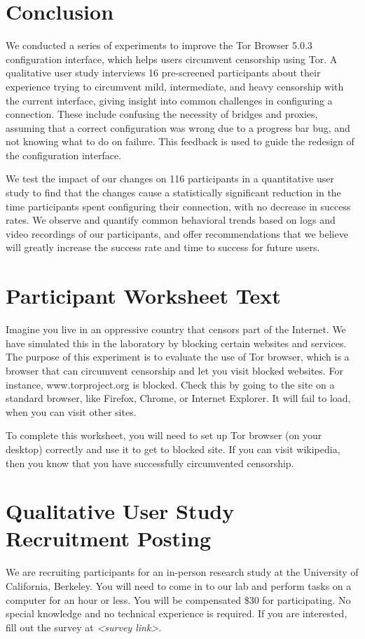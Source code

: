 \documentclass[USenglish,oneside,twocolumn]{article}
\begin{document}
\section{Conclusion} 
We conducted a series of experiments to improve the Tor Browser 5.0.3 configuration interface, which helps users circumvent censorship using Tor. A qualitative user study interviews 16 pre-screened participants about their experience trying to circumvent mild, intermediate, and heavy censorship with the current interface, giving insight into common challenges in configuring a connection. These include confusing the necessity of bridges and proxies, assuming that a correct configuration was wrong due to a progress bar bug, and not knowing what to do on failure. This feedback is used to guide the redesign of the configuration interface. 

We test the impact of our changes on 116 participants in a quantitative user study to find that the changes cause a statistically significant reduction in the time participants spent configuring their connection, with no decrease in success rates. We observe and quantify common behavioral trends based on logs and video recordings of our participants, and offer recommendations that we believe will greatly increase the success rate and time to success for future users. 




\appendix
\section{Participant Worksheet Text} 
\label{participant-worksheet}
Imagine you live in an oppressive country that censors part of the Internet. We have simulated this in the laboratory by blocking certain websites and services. The purpose of this experiment is to evaluate the use of Tor browser, which is a browser that can circumvent censorship and let you visit blocked websites. For instance, www.torproject.org is blocked. Check this by going to the site on a standard browser, like Firefox, Chrome, or Internet Explorer. It will fail to load, when you can visit other sites.

To complete this worksheet, you will need to set up Tor browser (on your desktop) correctly and use it to get to blocked site. If you can visit wikipedia, then you know that you have successfully circumvented censorship.

\section{Qualitative User Study Recruitment Posting} 
\label{qualitative-recruitment}
We are recruiting participants for an in-person research study at the University of California, Berkeley. You will need to come in to our lab and perform tasks on a computer for an hour or less. You will be compensated \$30 for participating. 
No special knowledge and no technical experience is required. If you are interested, fill out the survey at \textit{<survey link>}. 
\end{document}
